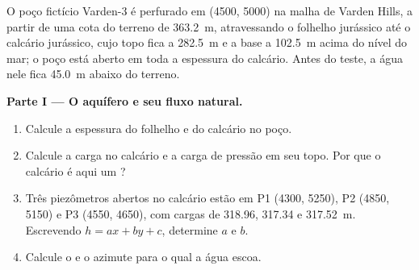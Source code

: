 \begin{problem}
\label{pb:b3:hydrogeology:1}
O poço fictício Varden-3 é perfurado em (4500, 5000) na malha de
Varden Hills, a partir de uma cota do terreno de \qty{363.2}{m}, atravessando o
folhelho jurássico até o calcário jurássico, cujo topo fica a
\qty{282.5}{m} e a base a \qty{102.5}{m} acima do nível do mar; o poço está aberto
em toda a espessura do calcário. Antes do teste, a água nele
fica \qty{45.0}{m} abaixo do terreno.

\medskip\noindent\textbf{Parte I --- O aquífero e seu fluxo natural.}
\begin{enumerate}
\item Calcule a espessura do folhelho e do calcário no poço.
\item Calcule a carga no calcário e a carga de pressão em seu topo.
  Por que o calcário é aqui um ?
\item Três piezômetros abertos no calcário estão em P1 (4300, 5250), P2
  (4850, 5150) e P3 (4550, 4650), com cargas de 318.96, 317.34 e
  \qty{317.52}{m}. Escrevendo $h = ax + by + c$, determine $a$ e $b$.
\item Calcule o  e o azimute para o qual a
  água escoa.
\end{enumerate}


\end{problem}

